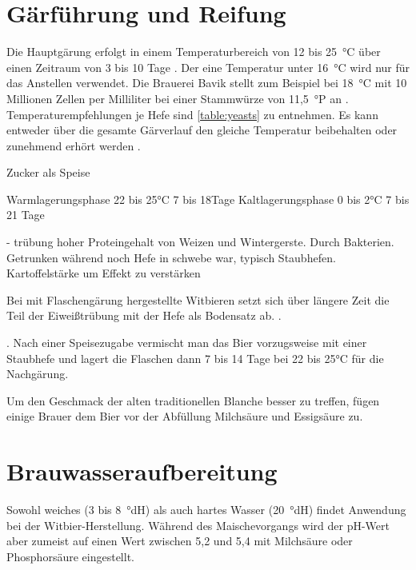 \documentclass[a4paper,parskip=half]{scrartcl}
\begin{document}
\section*{Gärführung und Reifung}

Die Hauptgärung erfolgt in einem Temperaturbereich von 12 bis 25~°C
über einen Zeitraum von 3 bis 10 Tage \parencite[13,18]{Strottner1999}.
Der eine Temperatur unter 16~°C wird nur für das Anstellen verwendet.
Die Brauerei Bavik stellt zum Beispiel bei 18~°C mit 10 Millionen Zellen
per Milliliter bei einer Stammwürze von 11,5~°P an \parencite[63]{Hieronymus2010}.
Temperaturempfehlungen je Hefe sind \autoref{table:yeasts} zu entnehmen.
Es kann entweder über die gesamte Gärverlauf den gleiche Temperatur beibehalten
oder zunehmend erhört werden \parencite[63]{Hieronymus2010}.



\parencite[13]{Strottner1999}

Zucker als Speise

\parencite[14]{Strottner1999}
Warmlagerungsphase
22 bis 25°C
7 bis 18Tage
Kaltlagerungsphase
0 bis 2°C
7 bis 21 Tage

\parencite[39]{Hieronymus2010}
- trübung hoher Proteingehalt von Weizen und Wintergerste.
 Durch Bakterien. Getrunken während noch Hefe in schwebe war,
 typisch Staubhefen. Kartoffelstärke um Effekt zu verstärken

Bei mit Flaschengärung hergestellte Witbieren setzt sich über längere Zeit
die Teil der Eiweißtrübung mit der Hefe als Bodensatz ab.
\parencite[18]{Strottner1999}. 



 \parencite[18]{Strottner1999}.
Nach einer Speisezugabe vermischt man das Bier vorzugsweise
mit einer Staubhefe und lagert die Flaschen dann 7 bis 14 Tage bei 22 bis 25°C für
die Nachgärung.

Um den Geschmack der alten traditionellen Blanche besser zu treffen, fügen einige
Brauer dem Bier vor der Abfüllung Milchsäure und Essigsäure zu.

\section*{Brauwasseraufbereitung}

Sowohl weiches (3 bis 8~°dH) als auch hartes Wasser (20~°dH) findet
Anwendung bei der Witbier-Herstellung. Während des Maischevorgangs
wird der pH-Wert aber zumeist auf einen Wert zwischen 5,2 und
5,4 mit Milchsäure oder Phosphorsäure eingestellt. \parencite[14]{Strottner1999}
\end{document}
